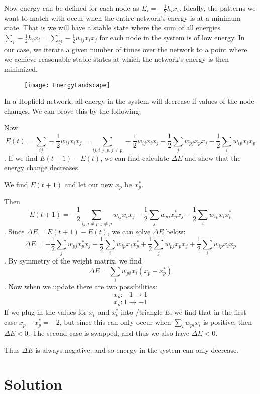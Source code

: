 \documentclass[]{article}
\theoremstyle{plain}
\theoremstyle{definition}
\begin{document}
Now energy can be defined for each node as $E_{i} = -\frac{1}{2}h_{i}x_{i}$.   Ideally, the patterns we want to match with occur when the entire network's energy is at a minimum state.  That is we will have a stable state where the sum of all energies $\sum_{i} -\frac{1}{2}h_{i}x_{i} = \sum_{ij} -\frac{1}{2}w_{ij}x_{i}x_{j}$ for each node in the system is of low energy.  In our case, we iterate a given number of times over the network to a point where we achieve reasonable stable states at which the network's energy is then minimized. 

\begin{figure}[h]
\centering
\texttt{[image: EnergyLandscape]}
\end{figure}


In a Hopfield network, all energy in the system will decrease if values of the node changes.  We can prove this by the following: 
	
Now \[E(t) = \sum_{ij} -\frac{1}{2}w_{ij}x_{i}x_{j} = \sum_{ij,i\neq p,j \neq p} -\frac{1}{2}w_{ij}x_{i}x_{j} - \frac{1}{2} \sum_{j} w_{pj}x_{p}x_{j} - \frac{1}{2} \sum_{i} w_{ip}x_{i}x_{p}\].
If we find $E(t+1) - E(t)$, we can find calculate $\Delta E$ and show that the energy change decreases.

We find $E(t+1)$ and let our new $x_{p}$ be $x^{*}_{p}$.

Then \[E(t+1) = -\frac{1}{2}\sum_{ij,i\neq p,j \neq p} w_{ij}x_{i}x_{j} - \frac{1}{2} \sum_{j} w_{pj}x^{*}_{p}x_{j} - \frac{1}{2} \sum_{i} w_{ip}x_{i}x^{*}_{p}\].
Since $\Delta E = E(t+1) - E(t)$, we can solve $\Delta E$ below:
\[\Delta E = - \frac{1}{2} \sum_{j} w_{pj}x^{*}_{p}x_{j} - \frac{1}{2} \sum_{i} w_{ip}x_{i}x^{*}_{p} + \frac{1}{2} \sum_{j} w_{pj}x_{p}x_{j} + \frac{1}{2} \sum_{i} w_{ip}x_{i}x_{p}\].
By symmetry of the weight matrix, we find
\[\Delta E = \sum_{i} w_{pi}x_{i}(x_{p}-x^{*}_{p})\].
Now when we update there are two possibilities:
\[x_{p} : -1 \rightarrow 1\]
\[x_{p} : 1 \rightarrow -1\]
If we plug in the values for $x_{p}$ and $x^{*}_{p}$ into /triangle $E$, we find that in the first case $x_{p}-x^{*}_{p} = -2$, but since this can only occur when $\sum_{i} w_{pi}x_{i}$ is positive, then $\Delta E < 0$.  The second case is swapped, and thus we also have $\Delta E < 0$.

Thus $\Delta E$ is always negative, and so energy in the system can only decrease.
	
	

\section{Solution}
\end{document}
